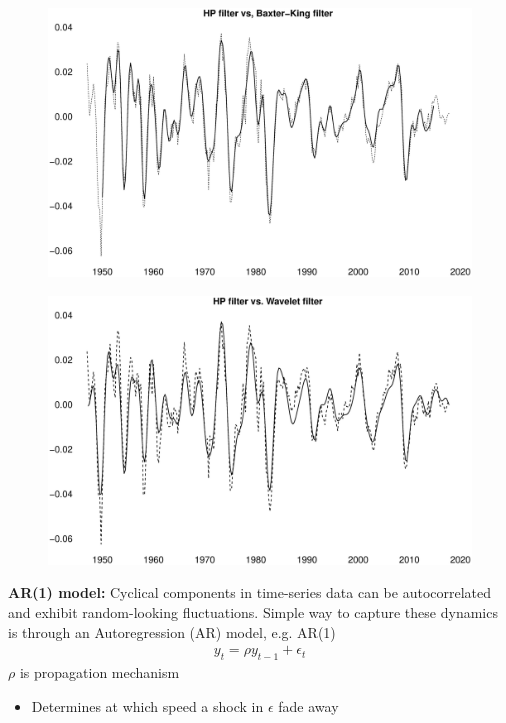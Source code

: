\documentclass{beamer}
\begin{document}
\begin{frame}
  \begin{figure}
    \includegraphics[scale=.3]{baxter_king.eps}
  \end{figure}
\end{frame}


\begin{frame}
  \begin{figure}
    \includegraphics[scale=.3]{wavelet.eps}
  \end{figure}
\end{frame}



\begin{frame}
  \textbf{AR(1) model:} Cyclical components in time-series data can be autocorrelated and exhibit random-looking fluctuations.
  Simple way to capture these dynamics is through an Autoregression (AR) model, e.g. AR(1)
  \begin{align}
     y_t = \rho y_{t-1} + \epsilon_t
   \end{align} 
   \medskip
   $\rho$ is propagation mechanism
   \begin{itemize}
      \item Determines at which speed a shock in $\epsilon$ fade away
    \end{itemize} 
\end{frame}
\end{document}
